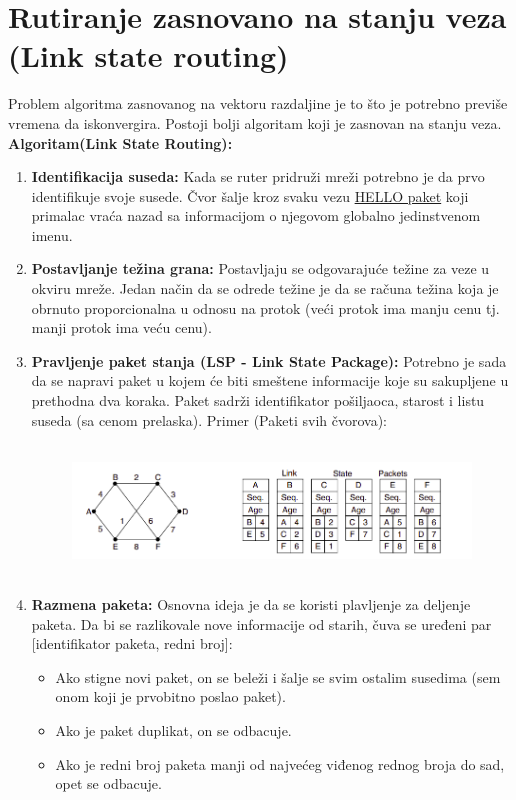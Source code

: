 \documentclass[a4paper]{article}
\begin{document}
\section{Rutiranje zasnovano na stanju veza (Link state routing)}
    Problem algoritma zasnovanog na vektoru razdaljine je to što je potrebno previše vremena
    da iskonvergira. Postoji bolji algoritam koji je zasnovan na stanju veza.\\
    \noindent \textbf{Algoritam(Link State Routing):}
    \begin{enumerate}
        \item \textbf{Identifikacija suseda:} Kada se ruter pridruži mreži potrebno je da prvo
              identifikuje svoje susede. Čvor šalje kroz svaku vezu \underline{HELLO paket} koji primalac
              vraća nazad sa informacijom o njegovom globalno jedinstvenom imenu. 
        \item \textbf{Postavljanje težina grana:} Postavljaju se odgovarajuće težine za
              veze u okviru mreže. Jedan način da se odrede težine je da se računa težina koja je obrnuto
              proporcionalna u odnosu na protok (veći protok ima manju cenu tj. manji protok
              ima veću cenu).
        \item \textbf{Pravljenje paket stanja (LSP - Link State Package):} Potrebno je 
              sada da se napravi paket 
              u kojem će biti smeštene informacije koje su sakupljene u prethodna dva koraka.
              Paket sadrži identifikator pošiljaoca, starost i listu suseda (sa cenom prelaska).
              Primer (Paketi svih čvorova):
              \begin{figure}[H]
                \begin{center}
                    \includegraphics[width=120mm,height=35mm]{Slike/rzsv1.png}
                \end{center}
              \end{figure}
        \item \textbf{Razmena paketa:} Osnovna ideja je da se koristi plavljenje za deljenje
              paketa. Da bi se razlikovale nove informacije od starih, čuva se uređeni par
              [identifikator paketa, redni broj]:
              \begin{itemize}
                \item Ako stigne novi paket, on se beleži i šalje
                      se svim ostalim susedima (sem onom koji je prvobitno poslao paket). 
                \item Ako je paket duplikat, on se odbacuje. 
                \item Ako je redni broj paketa manji od najvećeg viđenog rednog broja do sad,
                      opet se odbacuje. 
              \end{itemize}


\end{enumerate}
\end{document}
